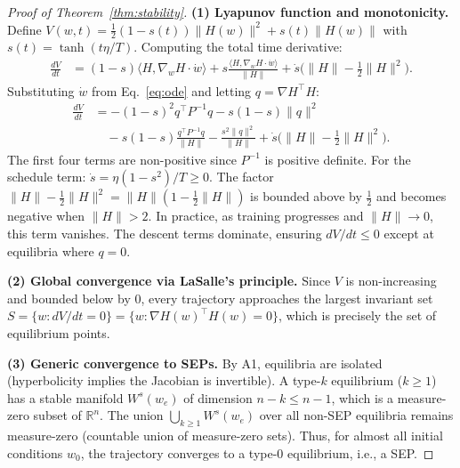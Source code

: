 \documentclass[10pt,twocolumn]{article}
\newcommand{\R}{\mathbb{R}}
\begin{document}
\begin{proof}[Proof of Theorem~\ref{thm:stability}]
\textbf{(1) Lyapunov function and monotonicity.}
Define $V(w,t) = \frac{1}{2}(1-s(t))\|H(w)\|^2 + s(t)\|H(w)\|$ with $s(t) = \tanh(t\eta/T)$. Computing the total time derivative:
\begin{align*}
\frac{dV}{dt} &= (1-s)\langle H, \nabla_w H \cdot \dot{w}\rangle + s \frac{\langle H, \nabla_w H \cdot \dot{w}\rangle}{\|H\|} + \dot{s}\bigl(\|H\| - \tfrac{1}{2}\|H\|^2\bigr).
\end{align*}
Substituting $\dot{w}$ from Eq.~\eqref{eq:ode} and letting $q = \nabla H^\top H$:
\begin{align*}
\frac{dV}{dt} &= -(1-s)^2 q^\top P^{-1} q - s(1-s)\|q\|^2 \\
&\quad - s(1-s)\frac{q^\top P^{-1} q}{\|H\|} - \frac{s^2 \|q\|^2}{\|H\|} + \dot{s}\bigl(\|H\| - \tfrac{1}{2}\|H\|^2\bigr).
\end{align*}
The first four terms are non-positive since $P^{-1}$ is positive definite. For the schedule term: $\dot{s} = \eta(1-s^2)/T \geq 0$. The factor $\|H\| - \frac{1}{2}\|H\|^2 = \|H\|(1 - \frac{1}{2}\|H\|)$ is bounded above by $\frac{1}{2}$ and becomes negative when $\|H\| > 2$. In practice, as training progresses and $\|H\| \to 0$, this term vanishes. The descent terms dominate, ensuring $dV/dt \leq 0$ except at equilibria where $q = 0$.

\textbf{(2) Global convergence via LaSalle's principle.}
Since $V$ is non-increasing and bounded below by 0, every trajectory approaches the largest invariant set $S = \{w : dV/dt = 0\} = \{w : \nabla H(w)^\top H(w) = 0\}$, which is precisely the set of equilibrium points.

\textbf{(3) Generic convergence to SEPs.}
By A1, equilibria are isolated (hyperbolicity implies the Jacobian is invertible). A type-$k$ equilibrium ($k \geq 1$) has a stable manifold $W^s(w_e)$ of dimension $n-k \leq n-1$, which is a measure-zero subset of $\R^n$. The union $\bigcup_{k \geq 1} W^s(w_e)$ over all non-SEP equilibria remains measure-zero (countable union of measure-zero sets). Thus, for almost all initial conditions $w_0$, the trajectory converges to a type-0 equilibrium, i.e., a SEP.
\end{proof}
\end{document}
